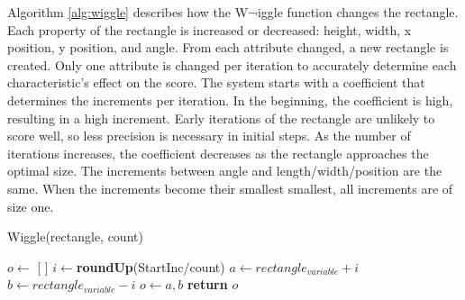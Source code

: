 
Algorithm \ref{alg:wiggle} describes how the W¬iggle function changes the rectangle. Each property of the rectangle is increased or decreased: height, width, x position, y position, and angle. From each attribute changed, a new rectangle is created. Only one attribute is changed per iteration to accurately determine each characteristic's effect on the score. The system starts with a coefficient that determines the increments per iteration. In the beginning, the coefficient is high, resulting in a high increment. Early iterations of the rectangle are unlikely to score well, so less precision is necessary in initial steps. As the number of iterations increases, the coefficient decreases as the rectangle approaches the optimal size. The increments between angle and length/width/position are the same. When the increments become their smallest smallest, all increments are of size one.\\

\begin{algorithm}
\caption{Wiggle(rectangle, count)}
\label{alg:wiggle}
\begin{algorithmic}[1]
\State $o \gets$ [ ]
\State $i \gets $\textbf{roundUp}(StartInc/count)
    \State $a \gets rectangle_{variable}+i$
    \State $b \gets rectangle_{variable}-i$
    \State $o \gets a,b$
\EndFor
\State \textbf{return} $o$
\end{algorithmic}
\end{algorithm}

